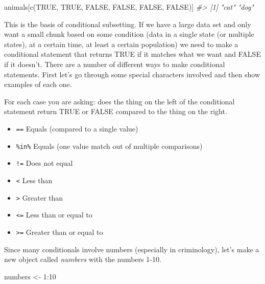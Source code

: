\documentclass[
]{krantz}
\makeatletter
\newenvironment{Shaded}{\begin{snugshade}}{\end{snugshade}}
\newcommand{\CommentTok}[1]{\textcolor[rgb]{0.37,0.37,0.37}{\textit{#1}}}
\newcommand{\ConstantTok}[1]{\textcolor[rgb]{0,0,0}{#1}}
\newcommand{\DecValTok}[1]{\textcolor[rgb]{0.06,0.06,0.06}{#1}}
\newcommand{\FunctionTok}[1]{\textcolor[rgb]{0,0,0}{#1}}
\newcommand{\NormalTok}[1]{#1}
\newcommand{\OtherTok}[1]{\textcolor[rgb]{0.37,0.37,0.37}{#1}}
\newcommand{\SpecialCharTok}[1]{\textcolor[rgb]{0,0,0}{#1}}
\providecommand{\tightlist}{%
  \setlength{\itemsep}{0pt}\setlength{\parskip}{0pt}}
\newenvironment{kframe}{%
\medskip{}
\setlength{\fboxsep}{.8em}
 \def\at@end@of@kframe{}%
 \ifinner\ifhmode%
  \def\at@end@of@kframe{\end{minipage}}%
  \begin{minipage}{\columnwidth}%
 \fi\fi%
 \def\FrameCommand##1{\hskip\@totalleftmargin \hskip-\fboxsep
 \colorbox{shadecolor}{##1}\hskip-\fboxsep
     \hskip-\linewidth \hskip-\@totalleftmargin \hskip\columnwidth}%
 \MakeFramed {\advance\hsize-\width
   \@totalleftmargin\z@ \linewidth\hsize
   \@setminipage}}%
 {\par\unskip\endMakeFramed%
 \at@end@of@kframe}
\renewenvironment{Shaded}{\begin{kframe}}{\end{kframe}}
\makeatother
\begin{document}
\begin{Shaded}
\begin{Highlighting}[]
\NormalTok{animals[}\FunctionTok{c}\NormalTok{(}\ConstantTok{TRUE}\NormalTok{, }\ConstantTok{TRUE}\NormalTok{, }\ConstantTok{FALSE}\NormalTok{, }\ConstantTok{FALSE}\NormalTok{, }\ConstantTok{FALSE}\NormalTok{, }\ConstantTok{FALSE}\NormalTok{)]}
\CommentTok{\#\textgreater{} [1] "cat" "dog"}
\end{Highlighting}
\end{Shaded}

This is the basis of conditional subsetting. If we have a large data set and only want a small chunk based on some condition (data in a single state (or multiple states), at a certain time, at least a certain population) we need to make a conditional statement that returns TRUE if it matches what we want and FALSE if it doesn't. There are a number of different ways to make conditional statements. First let's go through some special characters involved and then show examples of each one.

For each case you are asking: does the thing on the left of the conditional statement return TRUE or FALSE compared to the thing on the right.

\begin{itemize}
\tightlist
\item
  \texttt{==} Equals (compared to a single value)
\item
  \texttt{\%in\%} Equals (one value match out of multiple comparisons)
\item
  \texttt{!=} Does not equal
\item
  \texttt{\textless{}} Less than
\item
  \texttt{\textgreater{}} Greater than
\item
  \texttt{\textless{}=} Less than or equal to
\item
  \texttt{\textgreater{}=} Greater than or equal to
\end{itemize}

Since many conditionals involve numbers (especially in criminology), let's make a new object called \emph{numbers} with the numbers 1-10.

\begin{Shaded}
\begin{Highlighting}[]
\NormalTok{numbers }\OtherTok{\textless{}{-}} \DecValTok{1}\SpecialCharTok{:}\DecValTok{10}
\end{Highlighting}
\end{Shaded}
\end{document}
